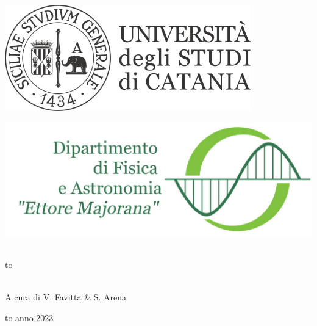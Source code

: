 \documentclass[openany,12pt]{book}%
\newcommand\blankpage{%
    \null
    \thispagestyle{empty}%
    \newpage}
\begin{document}
\thispagestyle{empty}
\begin{center}

\begin{minipage}[c]{0.45\textwidth}
\begin{flushleft}
\includegraphics[width=0.8\textwidth]{logo-unict-orizzontale-grigio.png}
\end{flushleft}
\end{minipage}
\hfill
\begin{minipage}[c]{0.45\textwidth}
\begin{flushright}
\includegraphics[width=\textwidth]{logo_dfa_orizzontale}
\end{flushright}
\end{minipage}\\
\medskip
\hbox to \textwidth{\hrulefill}

\vfill
\vfill

\uppercase{}\\

\vfill
\large{A cura di V. Favitta \& S. Arena }

\vfill
\vfill
\hbox to \textwidth{\hrulefill}
{\sc anno 2023}
\end{center}

\afterpage{\blankpage}
\newpage
\end{document}
